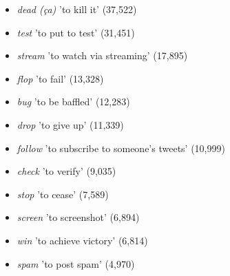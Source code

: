 \documentclass[output=paper]{langscibook}
\begin{document}
\begin{itemize}
\item \begin{styleListParagraph}
\textit{dead (ça)} 'to kill it' (37,522)
\end{styleListParagraph}
\item \begin{styleListParagraph}
\textit{test} 'to put to test' (31,451)
\end{styleListParagraph}
\item \begin{styleListParagraph}
\textit{stream} 'to watch via streaming' (17,895)
\end{styleListParagraph}
\item \begin{styleListParagraph}
\textit{flop} 'to fail' (13,328)
\end{styleListParagraph}
\item \begin{styleListParagraph}
\textit{bug} 'to be baffled' (12,283)
\end{styleListParagraph}
\item \begin{styleListParagraph}
\textit{drop} {}'to give up' (11,339)
\end{styleListParagraph}
\item \begin{styleListParagraph}
\textit{follow} 'to subscribe to someone's tweets' (10,999)
\end{styleListParagraph}
\item \begin{styleListParagraph}
\textit{check} 'to verify' (9,035)
\end{styleListParagraph}
\item \begin{styleListParagraph}
\textit{stop} 'to cease' (7,589)
\end{styleListParagraph}
\item \begin{styleListParagraph}
\textit{screen} 'to screenshot' (6,894)
\end{styleListParagraph}
\item \begin{styleListParagraph}
\textit{win} 'to achieve victory' (6,814)
\end{styleListParagraph}
\item \begin{styleListParagraph}
\textit{spam} 'to post spam' (4,970)

\end{styleListParagraph}
\end{itemize}
\end{document}
